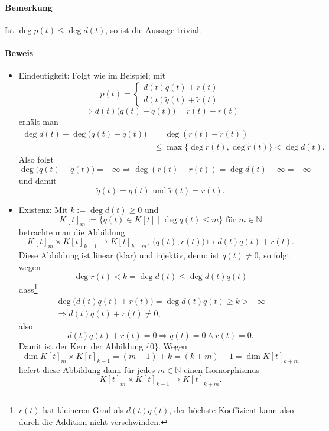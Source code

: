 \paragraph{Bemerkung}
	Ist $ \deg p(t)\leq \deg d(t) $, so ist die Aussage trivial.
\paragraph{Beweis}
	\begin{itemize}
	\item Eindeutigkeit: Folgt wie im Beispiel; mit
		\[
		p(t) =
			\begin{cases}
				d(t)q(t)+r(t)\\
				d(t)\tilde{q}(t)+\tilde{r}(t)
			\end{cases}
		\]
		\[
			\Rightarrow d(t)\big(q(t)-\tilde{q}(t)\big) = \tilde{r}(t)-r(t)
		\]
	erhält man
		\begin{align*}
			\deg d(t) + \deg \big(q(t)-\tilde{q}(t)\big) &= \deg (r(t)-\tilde{r}(t))\\
			&\leq \max \{\deg r(t), \deg \tilde{r} (t)\} < \deg d(t).
		\end{align*}
	Also folgt
		\[ \deg\big(q(t)-\tilde{q}(t)\big) = -\infty \Rightarrow \deg (r(t)-\tilde{r}(t)) = \deg d(t) -\infty = - \infty \]
	und damit
		\[ \tilde{q}(t)=q(t) \text{ und }\tilde{r}(t) = r(t). \]
	
	\item Existenz: Mit $ k := \deg d(t) \geq 0 $ und
		\[ K[t]_m := \{q(t)\in K[t]\mid \deg q(t)\leq m \} \text{ für }m\in \mathbb{N} \]
	betrachte man die Abbildung
		\[ K[t]_m \times K[t]_{k-1}\to K[t]_{k+m},\ \big(q(t), r(t)\big) \mapsto d(t)q(t)+r(t). \]
	Diese Abbildung ist linear (klar) und injektiv, denn:
	ist $ q(t) \neq 0 $, so folgt wegen
		\[ \deg r(t) < k = \deg d(t)\leq \deg d(t)q(t) \]
	dass\footnote{$r(t)$ hat kleineren Grad als $d(t)q(t)$, der höchste Koeffizient kann also durch die Addition nicht verschwinden.}
		\begin{gather*}
			\deg \big(d(t)q(t) + r(t)\big) = \deg d(t)q(t)\geq k > -\infty\\
			\Rightarrow d(t)q(t)+r(t)\neq 0,
		\end{gather*}
	also
		\[ d(t)q(t)+r(t)=0 \Rightarrow q(t)=0 \land r(t) = 0. \]
	Damit ist der Kern der Abbildung $\{0\}$.
	Wegen
		\[ \dim K[t]_m \times K[t]_{k-1} = (m+1) + k = (k+m) + 1 = \dim K[t]_{k+m} \]
	liefert diese Abbildung dann für jedes $ m\in \mathbb{N} $ einen Isomorphismus
		\[ K[t]_m \times K[t]_{k-1} \to K[t]_{k+m}. \]
	\end{itemize}
